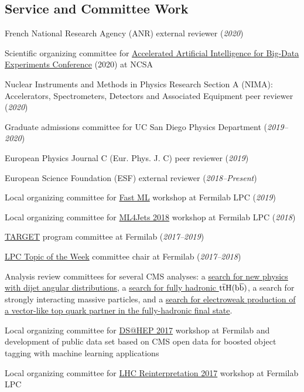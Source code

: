 \documentclass[11pt]{res}
\newcommand{\MarginText}[1]{\section{#1}\vspace{10pt}}
\begin{document}
\begin{resume}

\MarginText{Service and Committee Work}

French National Research Agency (ANR) external reviewer (\textit{2020})

Scientific organizing committee for \href{http://www.ncsa.illinois.edu/Conferences/AcceleratedAINCSA/}{Accelerated Artificial Intelligence for Big-Data Experiments Conference} (2020) at NCSA

Nuclear Instruments and Methods in Physics Research Section A (NIMA): Accelerators, Spectrometers, Detectors and Associated Equipment peer reviewer (\textit{2020})

Graduate admissions committee for UC San Diego Physics Department (\textit{2019--2020})

European Physics Journal C (Eur. Phys. J. C) peer reviewer (\textit{2019})

European Science Foundation (ESF) external reviewer (\textit{2018--Present})

Local organizing committee for \href{https://indico.cern.ch/e/fml}{Fast ML} workshop at Fermilab LPC (\textit{2019})

Local organizing committee for \href{https://indico.cern.ch/e/ml4jets2018}{ML4Jets 2018} workshop at Fermilab LPC (\textit{2018})

\href{http://diversity.fnal.gov/target/}{TARGET} program committee at Fermilab (\textit{2017--2019})

\href{http://lpc.fnal.gov/programs/topic/}{LPC Topic of the Week} committee chair at Fermilab (\textit{2017--2018})

Analysis review committees for several CMS analyses: a \href{http://arxiv.org/abs/1803.08030}{search for new physics with dijet angular distributions}, a \href{https://arxiv.org/abs/1803.06986}{search for fully hadronic $\mathrm{t}\overline{\mathrm{t}}\mathrm{H}(\mathrm{b}\overline{\mathrm{b}})$}, a search for strongly interacting massive particles, and a \href{https://arxiv.org/abs/1909.04721}{search for electroweak production of a vector-like top quark partner in the fully-hadronic final state}.

Local organizing committee for \href{http://dshep.fnal.gov}{DS@HEP 2017} workshop at Fermilab and development of public data set based on CMS open data for boosted object tagging with machine learning applications

Local organizing committee for \href{https://indico.cern.ch/event/639314/}{LHC Reinterpretation 2017} workshop at Fermilab LPC



\end{resume}
\end{document}
